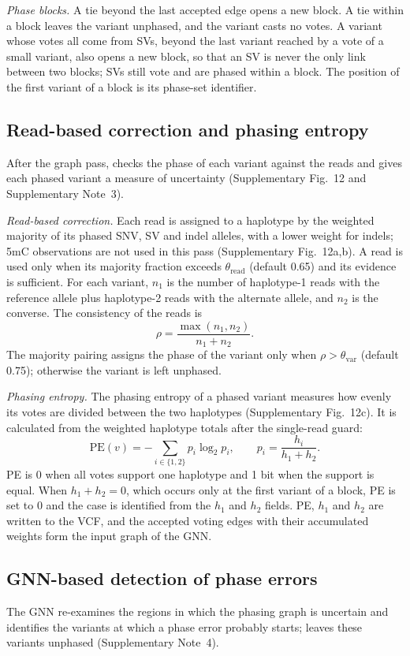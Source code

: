 \emph{Phase blocks.}  A tie beyond the last accepted edge opens a new block.  A tie within a block leaves the variant unphased, and the variant casts no votes.  A variant whose votes all come from SVs, beyond the last variant reached by a vote of a small variant, also opens a new block, so that an SV is never the only link between two blocks; SVs still vote and are phased within a block.  The position of the first variant of a block is its phase-set identifier.

\subsection*{Read-based correction and phasing entropy}
After the graph pass, \toolname checks the phase of each variant against the reads and gives each phased variant a measure of uncertainty (Supplementary Fig.~12 and Supplementary Note~3).

\emph{Read-based correction.}  Each read is assigned to a haplotype by the weighted majority of its phased SNV, SV and indel alleles, with a lower weight for indels; 5mC observations are not used in this pass (Supplementary Fig.~12a,b).  A read is used only when its majority fraction exceeds $\theta_{\mathrm{read}}$ (default 0.65) and its evidence is sufficient.  For each variant, $n_1$ is the number of haplotype-1 reads with the reference allele plus haplotype-2 reads with the alternate allele, and $n_2$ is the converse.  The consistency of the reads is
\[
\rho=\frac{\max(n_1,n_2)}{n_1+n_2}.
\]
The majority pairing assigns the phase of the variant only when $\rho>\theta_{\mathrm{var}}$ (default 0.75); otherwise the variant is left unphased.

\emph{Phasing entropy.}  The phasing entropy of a phased variant measures how evenly its votes are divided between the two haplotypes (Supplementary Fig.~12c).  It is calculated from the weighted haplotype totals after the single-read guard:
\begin{equation}
\mathrm{PE}(v)=-\sum_{i\in\{1,2\}}p_i\log_2p_i,
\qquad p_i=\frac{h_i}{h_1+h_2}.
\end{equation}
PE is 0 when all votes support one haplotype and 1 bit when the support is equal.  When $h_1+h_2=0$, which occurs only at the first variant of a block, PE is set to 0 and the case is identified from the $h_1$ and $h_2$ fields.  PE, $h_1$ and $h_2$ are written to the VCF, and the accepted voting edges with their accumulated weights form the input graph of the GNN.

\subsection*{GNN-based detection of phase errors}
The GNN re-examines the regions in which the phasing graph is uncertain and identifies the variants at which a phase error probably starts; \toolname leaves these variants unphased (Supplementary Note~4).

